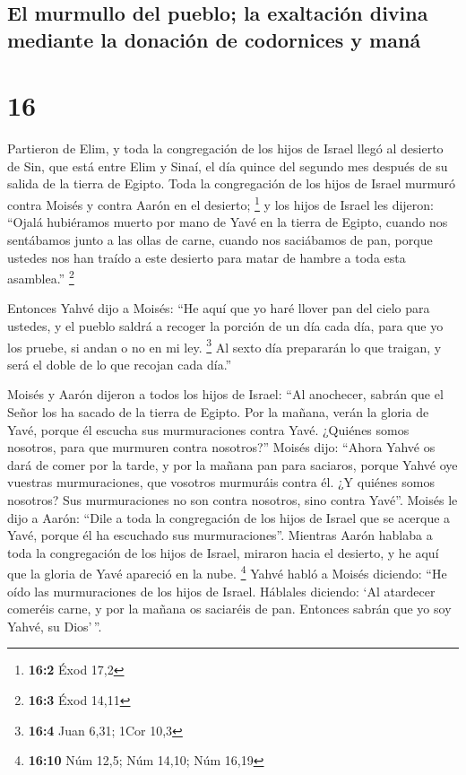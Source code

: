 \hypertarget{el-murmullo-del-pueblo-la-exaltaciuxf3n-divina-mediante-la-donaciuxf3n-de-codornices-y-manuxe1}{%
\subsection{El murmullo del pueblo; la exaltación divina mediante la
donación de codornices y
maná}\label{el-murmullo-del-pueblo-la-exaltaciuxf3n-divina-mediante-la-donaciuxf3n-de-codornices-y-manuxe1}}

\hypertarget{section-15}{%
\section{16}\label{section-15}}

 Partieron de Elim, y toda la congregación de los hijos de
Israel llegó al desierto de Sin, que está entre Elim y Sinaí, el día
quince del segundo mes después de su salida de la tierra de Egipto.
 Toda la congregación de los hijos de Israel murmuró
contra Moisés y contra Aarón en el desierto; \footnote{\textbf{16:2}
  Éxod 17,2}  y los hijos de Israel les dijeron: ``Ojalá
hubiéramos muerto por mano de Yavé en la tierra de Egipto, cuando nos
sentábamos junto a las ollas de carne, cuando nos saciábamos de pan,
porque ustedes nos han traído a este desierto para matar de hambre a
toda esta asamblea.'' \footnote{\textbf{16:3} Éxod 14,11}

 Entonces Yahvé dijo a Moisés: ``He aquí que yo haré
llover pan del cielo para ustedes, y el pueblo saldrá a recoger la
porción de un día cada día, para que yo los pruebe, si andan o no en mi
ley. \footnote{\textbf{16:4} Juan 6,31; 1Cor 10,3}  Al
sexto día prepararán lo que traigan, y será el doble de lo que recojan
cada día.''

 Moisés y Aarón dijeron a todos los hijos de Israel: ``Al
anochecer, sabrán que el Señor los ha sacado de la tierra de Egipto.
 Por la mañana, verán la gloria de Yavé, porque él escucha
sus murmuraciones contra Yavé. ¿Quiénes somos nosotros, para que
murmuren contra nosotros?''  Moisés dijo: ``Ahora Yahvé os
dará de comer por la tarde, y por la mañana pan para saciaros, porque
Yahvé oye vuestras murmuraciones, que vosotros murmuráis contra él. ¿Y
quiénes somos nosotros? Sus murmuraciones no son contra nosotros, sino
contra Yavé''.  Moisés le dijo a Aarón: ``Dile a toda la
congregación de los hijos de Israel que se acerque a Yavé, porque él ha
escuchado sus murmuraciones''.  Mientras Aarón hablaba a
toda la congregación de los hijos de Israel, miraron hacia el desierto,
y he aquí que la gloria de Yavé apareció en la nube. \footnote{\textbf{16:10}
  Núm 12,5; Núm 14,10; Núm 16,19}  Yahvé habló a Moisés
diciendo:  ``He oído las murmuraciones de los hijos de
Israel. Háblales diciendo: `Al atardecer comeréis carne, y por la mañana
os saciaréis de pan. Entonces sabrán que yo soy Yahvé, su Dios'\,''.

